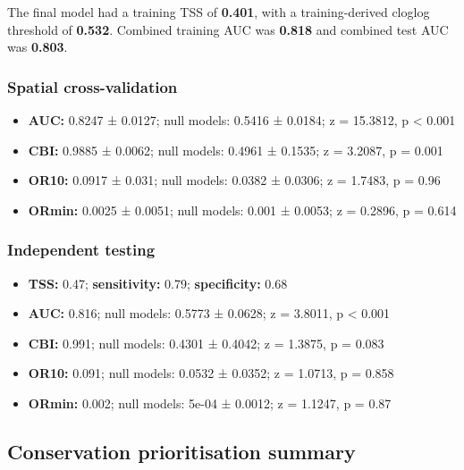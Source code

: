 \documentclass[
  openany]{book}
\providecommand{\tightlist}{%
  \setlength{\itemsep}{0pt}\setlength{\parskip}{0pt}}
\providecommand{\tightlist}{%
  \setlength{\itemsep}{0pt}%
  \setlength{\parskip}{0pt}%
}
\begin{document}
The final model had a training TSS of \textbf{0.401}, with a training-derived cloglog threshold of \textbf{0.532}. Combined training AUC was \textbf{0.818} and combined test AUC was \textbf{0.803}.

\subsubsection*{Spatial cross-validation}\label{spatial-cross-validation-21}

\begin{itemize}
\tightlist
\item
  \textbf{AUC:} 0.8247 ± 0.0127; null models: 0.5416 ± 0.0184; z = 15.3812, p \textless{} 0.001
\item
  \textbf{CBI:} 0.9885 ± 0.0062; null models: 0.4961 ± 0.1535; z = 3.2087, p = 0.001
\item
  \textbf{OR10:} 0.0917 ± 0.031; null models: 0.0382 ± 0.0306; z = 1.7483, p = 0.96
\item
  \textbf{ORmin:} 0.0025 ± 0.0051; null models: 0.001 ± 0.0053; z = 0.2896, p = 0.614
\end{itemize}

\subsubsection*{Independent testing}\label{independent-testing-21}

\begin{itemize}
\tightlist
\item
  \textbf{TSS:} 0.47; \textbf{sensitivity:} 0.79; \textbf{specificity:} 0.68
\item
  \textbf{AUC:} 0.816; null models: 0.5773 ± 0.0628; z = 3.8011, p \textless{} 0.001
\item
  \textbf{CBI:} 0.991; null models: 0.4301 ± 0.4042; z = 1.3875, p = 0.083
\item
  \textbf{OR10:} 0.091; null models: 0.0532 ± 0.0352; z = 1.0713, p = 0.858
\item
  \textbf{ORmin:} 0.002; null models: 5e-04 ± 0.0012; z = 1.1247, p = 0.87
\end{itemize}

\subsection*{Conservation prioritisation summary}\label{conservation-prioritisation-summary-21}
\end{document}
